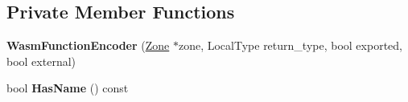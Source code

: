 \subsection*{Private Member Functions}
\begin{DoxyCompactItemize}
\item 
{\bfseries Wasm\+Function\+Encoder} (\hyperlink{classv8_1_1internal_1_1_zone}{Zone} $\ast$zone, Local\+Type return\+\_\+type, bool exported, bool external)\hypertarget{classv8_1_1internal_1_1wasm_1_1_wasm_function_encoder_adaaf6ed0ca63cb38e70adc9e23155131}{}\label{classv8_1_1internal_1_1wasm_1_1_wasm_function_encoder_adaaf6ed0ca63cb38e70adc9e23155131}

\item 
bool {\bfseries Has\+Name} () const \hypertarget{classv8_1_1internal_1_1wasm_1_1_wasm_function_encoder_a323460fdd84826f61bfc040ce4fc5178}{}\label{classv8_1_1internal_1_1wasm_1_1_wasm_function_encoder_a323460fdd84826f61bfc040ce4fc5178}

\end{DoxyCompactItemize}
